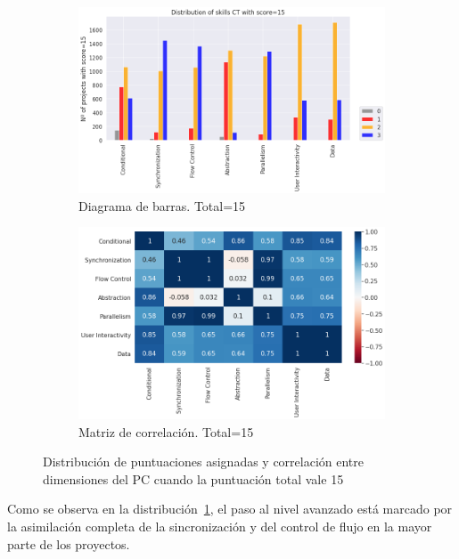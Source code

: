 \documentclass[a4paper, 12pt]{book}
\begin{document}
\begin{figure}[H]
    \centering
    \begin{subfigure}[h]{.49\textwidth} 
        \includegraphics[width=\textwidth]{img/distribucion_15_Snap}
        \caption{Diagrama de barras. Total=15}
        \label{fig:total15_Snap}
    \end{subfigure}       
    \begin{subfigure}[h]{.49\textwidth} 
        \includegraphics[width=\textwidth]{img/corr_15_Snap}
        \caption{Matriz de correlación. Total=15}
        \label{fig:corr15_Snap}
    \end{subfigure}
    \caption{Distribución de puntuaciones asignadas y correlación entre dimensiones del PC cuando la puntuación total vale 15}
\end{figure}

Como se observa en la distribución~\ref{fig:total15_Snap}, el paso al nivel avanzado está marcado por la asimilación completa de la sincronización y del control de flujo en la mayor parte de los proyectos.   
\end{document}
